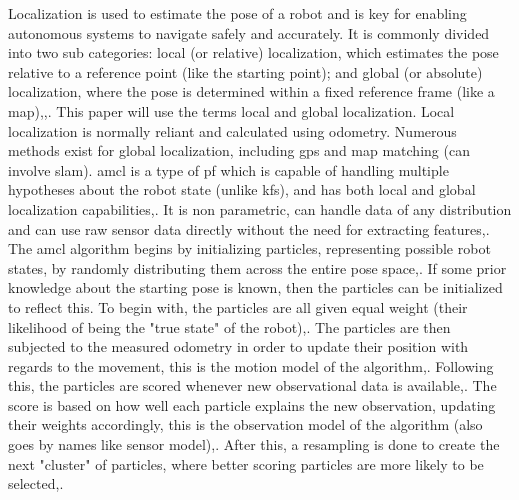 Localization is used to estimate the pose of a robot and is key for enabling autonomous systems to navigate safely and accurately\:\cite{akail_reliability_2018}.
It is commonly divided into two sub categories: local (or relative) localization, which estimates the pose relative to a reference point (like the starting point); and global (or absolute) localization, where the pose is determined within a fixed reference frame (like a map)\:\cite{alatise_review_2020},\cite{thrun_probabilistic_2006},\cite{corke_robotics_2023}. 
This paper will use the terms local and global localization.
Local localization is normally reliant and calculated using odometry\:\cite{alatise_review_2020}.
Numerous methods exist for global localization, including \ac{gps} and map matching (can involve \ac{slam})\:\cite{alatise_review_2020}.
\acf{amcl} is a type of \acf{pf} which is capable of handling multiple hypotheses about the robot state (unlike \acp{kf}), and has both local and global localization capabilities\:\cite{thrun_probabilistic_2006},\cite{corke_robotics_2023}. It is non parametric, can handle data of any distribution and can use raw sensor data directly without the need for extracting features\:\cite{thrun_probabilistic_2006},\cite{corke_robotics_2023}. 
The \ac{amcl} algorithm begins by initializing particles, representing possible robot states, by randomly distributing them across the entire pose space\:\cite{corke_robotics_2023},\cite{thrun_probabilistic_2006}. 
If some prior knowledge about the starting pose is known, then the particles can be initialized to reflect this\:\cite{corke_robotics_2023}. 
To begin with, the particles are all given equal weight (their likelihood of being the "true state" of the robot)\:\cite{corke_robotics_2023},\cite{thrun_probabilistic_2006}. 
The particles are then subjected to the measured odometry in order to update their position with regards to the movement, this is the motion model of the algorithm\:\cite{corke_robotics_2023},\cite{thrun_probabilistic_2006}. 
Following this, the particles are scored whenever new observational data is available\:\cite{corke_robotics_2023},\cite{thrun_probabilistic_2006}. The score is based on how well each particle explains the new observation, updating their weights accordingly, this is the observation model of the algorithm (also goes by names like sensor model)\:\cite{corke_robotics_2023},\cite{thrun_probabilistic_2006}. 
After this, a resampling is done to create the next "cluster" of particles, where better scoring particles are more likely to be selected\:\cite{corke_robotics_2023},\cite{thrun_probabilistic_2006}. 
